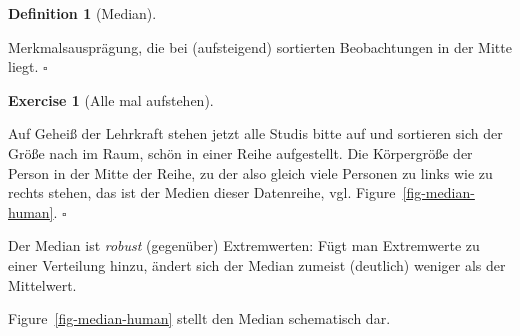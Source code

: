 \documentclass[
  letterpaper,
  DIV=11,
  numbers=noendperiod]{scrartcl}
\theoremstyle{definition}
\theoremstyle{definition}
\newtheorem{exercise}{Exercise}[section]
\theoremstyle{definition}
\newtheorem{definition}{Definition}[section]
\theoremstyle{remark}
\begin{document}
\begin{definition}[Median]\protect\hypertarget{def-median}{}\label{def-median}

Merkmalsausprägung, die bei (aufsteigend) sortierten Beobachtungen in
der Mitte liegt. \(\square\)

\end{definition}

\begin{exercise}[Alle mal
aufstehen]\protect\hypertarget{exr-aufstellen}{}\label{exr-aufstellen}

Auf Geheiß der Lehrkraft stehen jetzt alle Studis bitte auf und
sortieren sich der Größe nach im Raum, schön in einer Reihe aufgestellt.
Die Körpergröße der Person in der Mitte der Reihe, zu der also gleich
viele Personen zu links wie zu rechts stehen, das ist der Medien dieser
Datenreihe, vgl. Figure~\ref{fig-median-human}. \(\square\)

\end{exercise}

Der Median ist \emph{robust} (gegenüber) Extremwerten: Fügt man
Extremwerte zu einer Verteilung hinzu, ändert sich der Median zumeist
(deutlich) weniger als der Mittelwert.

Figure~\ref{fig-median-human} stellt den Median schematisch dar.
\end{document}
